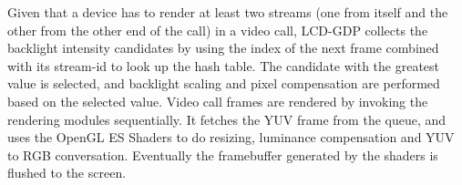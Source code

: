 Given that a device has to render at least two streams 
(one from itself and the other from the other end of the call) in a video call,
LCD-GDP collects the backlight intensity candidates by using the index of the next
frame combined with its stream-id to look up the hash table.
The candidate with the greatest value is selected, and 
backlight scaling and pixel compensation are performed based on the selected value.
Video call frames are rendered by invoking the rendering modules
sequentially. It fetches the YUV frame from the queue, and uses the
OpenGL ES Shaders to do resizing, luminance compensation and YUV to RGB
conversation. Eventually the framebuffer generated by the shaders is
flushed to the screen. 








